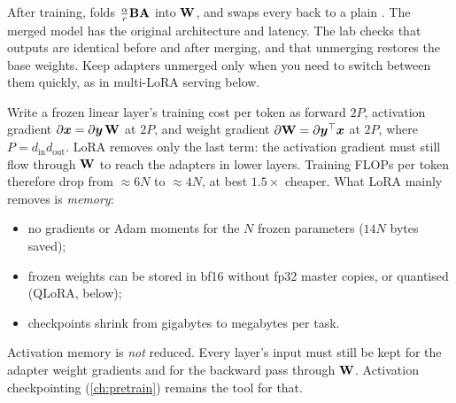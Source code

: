 \begin{keyidea}
After training,  folds $\frac{\alpha}{r}\mathbf{B}\mathbf{A}$ into $\mathbf{W}$,
and  swaps every  back to a plain .
The merged model has the original architecture and latency. The lab checks that
outputs are identical before and after merging, and that unmerging restores the base
weights. Keep adapters unmerged only when you need to switch between them quickly, as
in multi-LoRA serving below.
\end{keyidea}

\begin{systemslens}
Write a frozen linear layer's training cost per token as forward $2P$, activation
gradient $\partial\bm{x}=\partial\bm{y}\,\mathbf{W}$ at $2P$, and weight gradient
$\partial\mathbf{W}=\partial\bm{y}^\top\bm{x}$ at $2P$, where $P=d_\text{in}d_\text{out}$.
LoRA removes only the last term: the activation gradient must still flow through
$\mathbf{W}$ to reach the adapters in lower layers. Training FLOPs per token therefore
drop from $\approx6N$ to $\approx4N$, at best $1.5\times$ cheaper. What LoRA mainly
removes is \emph{memory}:
\begin{itemize}
\item no gradients or Adam moments for the $N$ frozen parameters ($14N$ bytes saved);
\item frozen weights can be stored in bf16 without fp32 master copies, or quantised
(QLoRA, below);
\item checkpoints shrink from gigabytes to megabytes per task.
\end{itemize}
Activation memory is \emph{not} reduced. Every layer's input must still be kept for the
adapter weight gradients and for the backward pass through $\mathbf{W}$. Activation
checkpointing (\cref{ch:pretrain}) remains the tool for that.
\end{systemslens}


